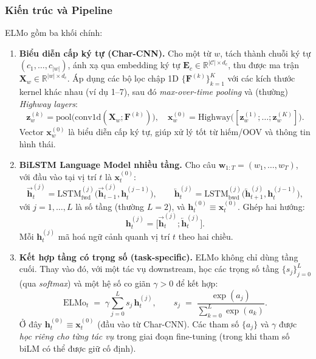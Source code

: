 \subsubsection{Kiến trúc và Pipeline}
\label{ssec:elmo_architecture}

ELMo gồm ba khối chính:

\begin{enumerate}
  \item \textbf{Biểu diễn cấp ký tự (Char-CNN).}
  Cho một từ $w$, tách thành chuỗi ký tự $(c_1,\dots,c_{|w|})$, ánh xạ qua embedding ký tự $\mathbf{E}_c \in \mathbb{R}^{|\mathcal{C}|\times d_c}$, thu được ma trận $\mathbf{X}_w \in \mathbb{R}^{|w|\times d_c}$. Áp dụng các bộ lọc chập 1D $\{\mathbf{F}^{(k)}\}_{k=1}^K$ với các kích thước kernel khác nhau (ví dụ 1–7), sau đó \emph{max-over-time pooling} và (thường) \emph{Highway layers}:
  \[
    \mathbf{z}_w^{(k)} = \mathrm{pool}\big(\mathrm{conv1d}(\mathbf{X}_w; \mathbf{F}^{(k)})\big), 
    \quad
    \mathbf{x}_w^{(0)} = \mathrm{Highway}\big([\mathbf{z}_w^{(1)};\dots;\mathbf{z}_w^{(K)}]\big).
  \]
  Vector $\mathbf{x}_w^{(0)}$ là biểu diễn cấp ký tự, giúp xử lý tốt từ hiếm/OOV và thông tin hình thái.

  \item \textbf{BiLSTM Language Model nhiều tầng.}
  Cho câu $\mathbf{w}_{1:T} = (w_1,\dots,w_T)$, với đầu vào tại vị trí $t$ là $\mathbf{x}_t^{(0)}$:
  \[
    \overrightarrow{\mathbf{h}}_{t}^{(j)} = \mathrm{LSTM}^{(j)}_{\mathrm{fwd}}\big(\overrightarrow{\mathbf{h}}_{t-1}^{(j)}, \mathbf{h}_{t}^{(j-1)}\big), 
    \qquad
    \overleftarrow{\mathbf{h}}_{t}^{(j)} = \mathrm{LSTM}^{(j)}_{\mathrm{bwd}}\big(\overleftarrow{\mathbf{h}}_{t+1}^{(j)}, \mathbf{h}_{t}^{(j-1)}\big),
  \]
  với $j=1,\dots,L$ là số tầng (thường $L=2$), và $\mathbf{h}_t^{(0)}\equiv \mathbf{x}_t^{(0)}$. Ghép hai hướng:
  \[
    \mathbf{h}_t^{(j)} = \big[\overrightarrow{\mathbf{h}}_{t}^{(j)} ; \overleftarrow{\mathbf{h}}_{t}^{(j)}\big].
  \]
  Mỗi $\mathbf{h}_t^{(j)}$ mã hoá ngữ cảnh quanh vị trí $t$ theo hai chiều.

  \item \textbf{Kết hợp tầng có trọng số (task-specific).}
  ELMo không chỉ dùng tầng cuối. Thay vào đó, với một tác vụ downstream, học các trọng số tầng $\{s_j\}_{j=0}^{L}$ (qua \emph{softmax}) và một hệ số co giãn $\gamma>0$ để kết hợp:
  \[
    \text{ELMo}_t \;=\; \gamma \sum_{j=0}^{L} s_j\, \mathbf{h}_t^{(j)}, 
    \qquad 
    s_j \;=\; \frac{\exp(a_j)}{\sum_{k=0}^{L}\exp(a_k)}.
  \]
  Ở đây $\mathbf{h}_t^{(0)}\equiv \mathbf{x}_t^{(0)}$ (đầu vào từ Char-CNN). Các tham số $\{a_j\}$ và $\gamma$ được \emph{học riêng cho từng tác vụ} trong giai đoạn fine-tuning (trong khi tham số biLM có thể được giữ cố định).
\end{enumerate}

